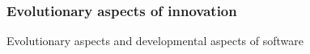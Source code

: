 \documentclass{beamer}
\begin{document}


\begin{frame}
\frametitle{Evolutionary aspects of innovation}

Evolutionary aspects and developmental aspects of software
\end{frame}

\end{document}
